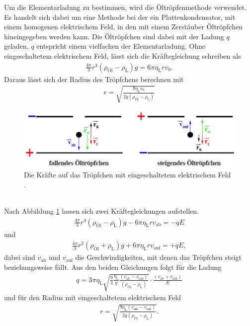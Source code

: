 Um die Elementarladung zu bestimmen, wird die Öltröpfenmethode verwendet. Es handelt sich dabei um eine Methode bei der ein Plattenkondensator, mit einem homogenen elektrischem Feld, in den mit einem Zerstäuber Öltröpfchen hineingegeben werden kann. Die Öltröpfchen sind dabei mit der Ladung $q$ geladen, $q$ entspricht einem vielfachen der Elementarladung. Ohne eingeschaltetem elektrischem Feld, lässt sich die Kräftegleichung schreiben als
\begin{align}
\frac{4\pi}{3}r^3\left( \rho_{\text{Öl}}-\rho_\text{L} \right)g=6\pi \eta_\text{L}rv_0.
\end{align}
Daraus lässt sich der Radius des Tröpfchens berechnen mit
\begin{align}
r=\sqrt{\frac{9\eta_\text{L}v_0}{2g\left( \rho_\text{Öl}-\rho_\text{L} \right)}}
\end{align}
\begin{figure}[h!]
\centering
\includegraphics[scale=1]{Grafiken/Schema-Kondensator.pdf}
\caption{Die Kräfte auf das Tröpfchen mit eingeschaltetem elektrischem Feld \cite{V503}.\label{e-Feld}}
\end{figure}\\
Nach Abbildung \ref{e-Feld} lassen sich zwei Kräftegleichungen aufstellen.
\begin{align}
\frac{4\pi}{3}r^3\left( \rho_{\text{Öl}}-\rho_\text{L} \right)g-6\pi\eta_\text{L}rv_\text{ab}=-qE
\end{align}
und
\begin{align}
\frac{4\pi}{3}r^3\left( \rho_{\text{Öl}}+\rho_\text{L} \right)g+6\pi\eta_\text{L}rv_\text{auf}=+qE,
\end{align}
dabei sind $v_\text{ab}$ und $v_\text{auf}$ die Geschwindigkeiten, mit denen das Tröpfchen steigt beziehungsweise fällt. Aus den beiden Gleichungen folgt für die Ladung
\begin{align}
q=3\pi\eta_\text{L}\sqrt{\frac{9}{4}\frac{\eta_\text{L}}{g}\frac{(v_\text{ab}-v_\text{auf})}{(\rho_\text{Öl}-\rho_\text{L})}}\cdot\frac{(v_\text{ab}+v_\text{auf})}{E}
\end{align}
und für den Radius mit eingeschaltetem elektrischem Feld
\begin{align}
\label{eq:Theorie_Radius}
r=\sqrt{\frac{9\eta_\text{L}(v_\textbf{ab}-v_\text{auf})}{2g(\rho_\text{Öl}-\rho_\text{L})}}.
\end{align}
